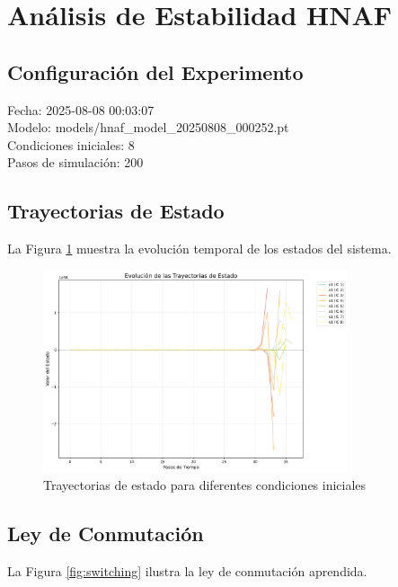 \section{Análisis de Estabilidad HNAF}

\subsection{Configuración del Experimento}
Fecha: 2025-08-08 00:03:07\\Modelo: models/hnaf_model_20250808_000252.pt\\Condiciones iniciales: 8\\Pasos de simulación: 200

\subsection{Trayectorias de Estado}
La Figura \ref{fig:trajectories} muestra la evolución temporal de los estados del sistema.

\begin{figure}[h]
\centering
\includegraphics[width=0.8\textwidth]{plot_trajectories.png}
\caption{Trayectorias de estado para diferentes condiciones iniciales}
\label{fig:trajectories}
\end{figure}

\subsection{Ley de Conmutación}
La Figura \ref{fig:switching} ilustra la ley de conmutación aprendida.


